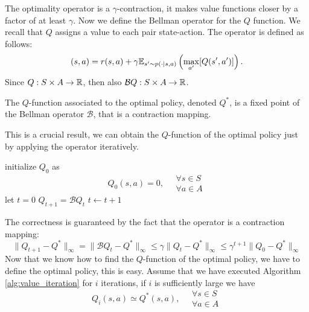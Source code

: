 \documentclass[10pt, a4paper]{report}
\begin{document}
\noindent The optimality operator is a $\gamma$-contraction, it makes value functions closer by a factor of at least $\gamma$. Now we define the Bellman operator for the $Q$ function. We recall that $Q$ assigns a value to each pair state-action. The operator is defined as follows:\begin{equation}
    [\mathcal B Q](s,a)=r(s,a)+\gamma\VA_{s'\sim p(\cdot \mid s,a)}\left(\max_{a'}[Q(s',a')]\right).
\end{equation}
Since $Q:S\times A \rightarrow {\mathbb R}$, then also $\mathcal B Q:S\times A \rightarrow {\mathbb R}$.
\begin{boxproposition}{}{}
    The $Q$-function associated to the optimal policy, denoted $Q^*$, is a fixed point of the Bellman operator $\mathcal B$, that is a contraction mapping.
\end{boxproposition}
This is a crucial result, we can obtain the $Q$-function of the optimal policy just by applying the operator iteratively.
\begin{algorithm}[H]
\caption{Value Iteration}\label{alg:value_iteration}
\begin{algorithmic}[1]
\State initialize $Q_0$ as\begin{equation*}
    Q_0(s,a)=0,\quad \begin{matrix}
        \forall s\in S\\\forall a\in A
    \end{matrix}
\end{equation*} 
\State let $t=0$ 
\Do
\State $Q_{t+1}=\mathcal BQ_t$
\State $t\leftarrow t+1$
\end{algorithmic}
\end{algorithm}
\noindent The correctness is guaranteed by the fact that the operator is a contraction mapping:\begin{equation}
    \|Q_{t+1}-Q^*\|_\infty=\|\mathcal BQ_{t}-Q^*\|_\infty\le  
    \gamma\|Q_t-Q^*\|_\infty\le  \gamma^{t+1}\|Q_0-Q^*\|_\infty
\end{equation}
Now that we know how to find the $Q$-function of the optimal policy, we have to define the optimal policy, this is easy. Assume that we have executed Algorithm \ref{alg:value_iteration} for $i$ iterations, if $i$ is sufficiently large we have \begin{equation}
    Q_i(s,a)\simeq Q^*(s,a),\quad \begin{matrix}
        \forall s\in S\\\forall a\in A
    \end{matrix}
\end{equation}
\end{document}
